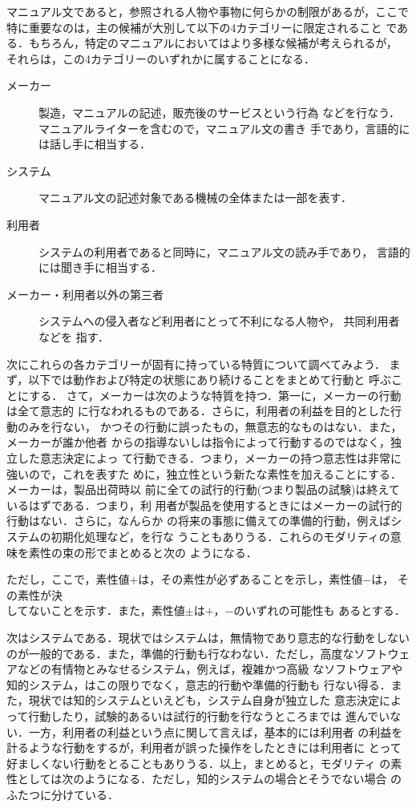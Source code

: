 マニュアル文であると，参照される人物や事物に何らかの制限があるが，ここで
特に重要なのは，{\dg 主}の候補が大別して以下の4カテゴリーに限定されること
である．もちろん，特定のマニュアルにおいてはより多様な候補が考えられるが，
それらは，この4カテゴリーのいずれかに属することになる．

\begin{description}
  \item[メーカー] 製造，マニュアルの記述，販売後のサービスという行為
などを行なう． マニュアルライターを含むので，マニュアル文の書き
手であり，言語的には話し手に相当する．
  \item[システム] マニュアル文の記述対象である機械の全体または一部を表す．

  \item[利用者] システムの利用者であると同時に，マニュアル文の読み手であり，
言語的には聞き手に相当する．
  \item[メーカー・利用者以外の第三者] 
システムへの侵入者など利用者にとって不利になる人物や， 共同利用者などを
指す． 
\end{description}

次にこれらの各カテゴリーが固有に持っている特質について調べてみよう．
まず，以下では動作および特定の状態にあり続けることをまとめて{\dg 行動}と
呼ぶことにする．
さて，メーカーは次のような特質を持つ．第一に，メーカーの行動は全て意志的
に行なわれるものである．さらに，利用者の利益を目的とした行動のみを行ない，
かつその行動に誤ったもの，無意志的なものはない．また，メーカーが誰か他者
からの指導ないしは指令によって行動するのではなく，独立した意志決定によっ
て行動できる．つまり，メーカーの持つ意志性は非常に強いので，これを表すた
めに，独立性という新たな素性を加えることにする．メーカーは，製品出荷時以
前に全ての試行的行動(つまり製品の試験)は終えているはずである．つまり，利
用者が製品を使用するときにはメーカーの試行的行動はない．さらに，なんらか
の将来の事態に備えての準備的行動，例えばシステムの初期化処理など，を行な
うこともありうる．これらのモダリティの意味を素性の束の形でまとめると次の
ようになる．


ただし，ここで，素性値$+$は，その素性が必ずあることを示し，素性値$-$は，
その素性が決\\してないことを示す．また，素性値$\pm$は$+$，$-$のいずれの可能性も
あるとする．

次はシステムである．現状ではシステムは，無情物であり意志的な行動をしない
のが一般的である．また，準備的行動も行なわない．ただし，高度なソフトウェ
アなどの有情物とみなせるシステム，例えば，複雑かつ高級
なソフトウェアや知的システム，はこの限りでなく，意志的行動や準備的行動も
行ない得る．また，現状では知的システムといえども，システム自身が独立した
意志決定によって行動したり，試験的あるいは試行的行動を行なうところまでは
進んでいない．一方，利用者の利益という点に関して言えば，基本的には利用者
の利益を計るような行動をするが，利用者が誤った操作をしたときには利用者に
とって好ましくない行動をとることもありうる．以上，まとめると，モダリティ
の素性としては次のようになる．ただし，知的システムの場合とそうでない場合
のふたつに分けている．

